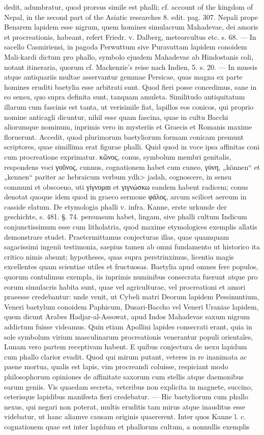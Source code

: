 \documentclass[a4paper, 11pt, oneside, polutonikogreek, german]{article}
\begin{document}
dedit, adumbratur, quod prorsus simile est phalli; cf. account of the kingdom of Nepal, in the second part of the Asiatic researches 8. edit. pag. 307. Nepali prope Benarem lapidem esse nigrum, quem homines simulacrum Mahadevae, dei amoris et procreationis, habeant, refert Friedr. v. Dalberg, meteorcultus etc. s. 68. --- In sacello Casmiriensi, in pagoda Perwuttum sive Puravattam lapidem conoidem Mali-kardi dictum pro phallo, symbolo ejusdem Mahadevae ab Hindostanis coli, notant itineraria, quorum cf. Mackenzie's reise nach Indien, 5. s. 20. --- In museis atque antiquariis multae asservantur gemmae Persicae, quas magna ex parte homines eruditi baetylia esse arbitrati sunt. Quod fieri posse concedimus, sane in eo sensu, quo supra definita sunt, tanquam amuleta. Similitudo antiquitatum illarum cum fascinis est tanta, ut verisimile fiat, lapillos eos conicos, qui proprio nomine anticagli dicuntur, nihil esse quam fascina, quae in cultu Bacchi aliorumque nominum, inprimis vero in mysteriis et Graecis et Romanis maxime floruerunt. Accedit, quod plurimorum baetyliorum formam conicam premunt scriptores, quae simillima erat figurae phalli. Quid quod in voce ipsa affinitas coni cum procreatione exprimatur. κῶνος, conus, symbolum membri genitalis, respondens voci γοῦνος, cunnus, cognationem habet cum cuneo, γύνη, „können“ et „kennen“ pariter ac hebraicum verbum \<ydh> jadah, cognoscere, in sensu communi et obscoeno, uti γίγνομαι et γιγνώσκω eandem habent radicem; conus denotat quoque idem quod in graeco sermone φάλος, arcum scilicet aereum in casside elatum. De etymologia phalli v. infra. Kanne, erste urkunde der geschichte, s. 481. §. 74. persuasum habet, lingam, sive phalli cultum Indicum conjunctissimum esse cum litholatria, quod maxime etymologices exemplis allatis demonstrare studet. Praetermittamus conjecturas illas, quae quamquam sagacissimi ingenii testimonia, saepius tamen ab omni fundamento ut historico ita critico nimis absunt; hypotheses, quas supra perstrinximus, licentia magis excellentes quam scientiae utiles et fructuosas. Baetylia apud omnes fere populos, quorum contulimus exempla, iis inprimis numinibus consecrata fuerunt atque pro eorum simulacris habita sunt, quae vel agriculturae, vel procreationi et amori praeesse credebantur: unde venit, ut Cybeli matri Deorum lapidem Pessinuntium, Veneri baetylum conoidem Paphicum, Dusari-Baccho vel Veneri Uraniae lapidem, quem dicunt Arabes Hadjar-al-Assowat, apud Indos Mahadevae saxum nigrum addictum fuisse videamus. Quin etiam Apollini lapides consecrati erant, quia in sole symbolum virium masculinarum procreationis venerantur populi orientales, Lunam vero partem receptivam habent. E quibus conjectura de nexu lapidum cum phallo clarior evadit. Quod qui mirum putant, veteres in re inanimata ac paene mortua, qualis est lapis, vim procreandi coluisse, respiciant modo philosophorum opiniones de affinitate saxorum cum stellis atque daemonibus earum geniis. Vis quaedam secreta, veteribus non explicita in magnete, succino, ceterisque lapidibus manifesta fieri credebatur. --- Hic baetyliorum cum phallo nexus, qui negari non poterat, multis eruditis tam mirus atque inauditus esse videbatur, ut hanc aliamve causam originis quaererent. Inter quos Kanne l. c. cognationem quae est inter lapidum et phallorum cultum, a nonnullis exemplis 
\end{document}
